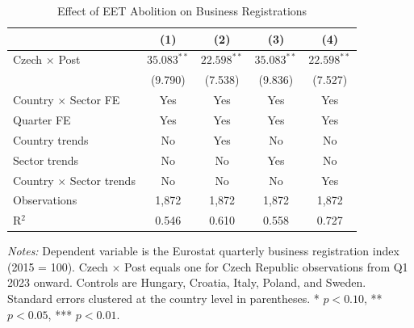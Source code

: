 
\begin{table}[H]
\centering
\caption{Effect of EET Abolition on Business Registrations}
\label{tab:main}
\begin{threeparttable}
\begin{tabular}{lcccc}
\toprule
 & (1) & (2) & (3) & (4) \\
\midrule
Czech $\times$ Post & $35.083^{**}$ & $22.598^{**}$ & $35.083^{**}$ & $22.598^{**}$ \\
 & (9.790) & (7.538) & (9.836) & (7.527) \\
\midrule
Country $\times$ Sector FE & Yes & Yes & Yes & Yes \\
Quarter FE & Yes & Yes & Yes & Yes \\
Country trends & No & Yes & No & No \\
Sector trends & No & No & Yes & No \\
Country $\times$ Sector trends & No & No & No & Yes \\
Observations & 1,872 & 1,872 & 1,872 & 1,872 \\
R$^2$ & 0.546 & 0.610 & 0.558 & 0.727 \\
\bottomrule
\end{tabular}
\begin{tablenotes}[flushleft]
\small
\item \textit{Notes:} Dependent variable is the Eurostat quarterly business registration index (2015 = 100). Czech $\times$ Post equals one for Czech Republic observations from Q1 2023 onward. Controls are Hungary, Croatia, Italy, Poland, and Sweden. Standard errors clustered at the country level in parentheses. * $p<0.10$, ** $p<0.05$, *** $p<0.01$.
\end{tablenotes}
\end{threeparttable}
\end{table}


